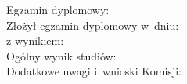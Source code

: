 \newpage
	\thispagestyle{empty}
\begin{flushleft}
    	\begin{minipage}{11cm}
		Egzamin dyplomowy: \\
		Złożył egzamin dyplomowy w~dniu: \dotfill \\
		z wynikiem: \dotfill \\
		Ogólny wynik studiów: \dotfill \\
		Dodatkowe uwagi i~wnioski Komisji: \dotfill \\
		\dotfill
	\end{minipage}
\end{flushleft}
